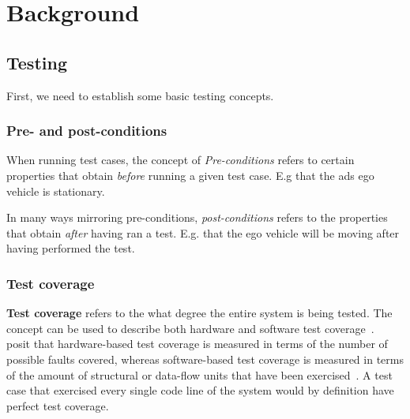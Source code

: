 \chapter{Background}

\section{Testing}

First, we need to establish some basic testing concepts.

\subsection{Pre- and post-conditions}\label{sec:testingConditions}

When running test cases, the concept of \textit{Pre-conditions}
refers to certain properties that
obtain \textit{before} running a given test case. E.g that the \acrshort{ads} ego vehicle is
stationary.

In many ways mirroring pre-conditions, \textit{post-conditions} refers to the properties that obtain
\textit{after} having ran a test. E.g. that the ego vehicle will be moving after having performed
the test.


\subsection{Test coverage}\label{sec:testCoverage}

\textbf{Test coverage} refers to the what degree the entire system is being tested. The concept can
be used to describe both hardware and software test
coverage~\cite[187]{testCoverage94}.~\citeauthor{testCoverage94} posit that hardware-based test
coverage is measured in terms of the number of possible faults covered, whereas software-based test
coverage is measured in terms of the amount of structural or data-flow units that have been
exercised~\cite[187]{testCoverage94}. A test case that exercised every single code line of the
system would by definition have perfect test coverage.


% 

